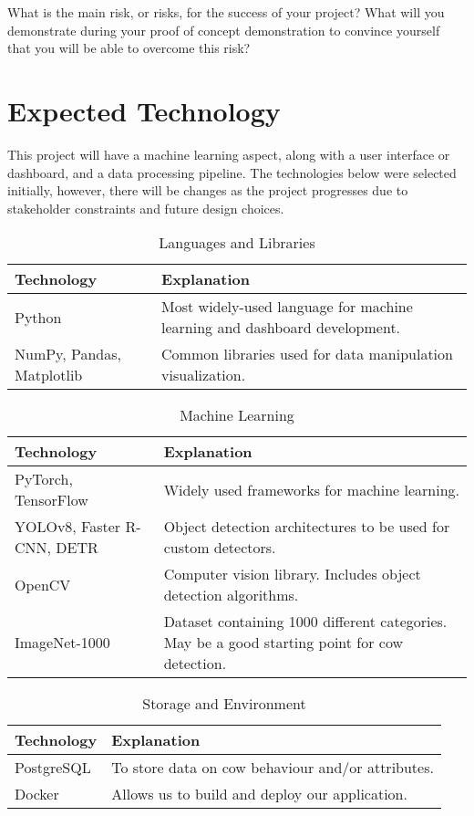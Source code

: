 \documentclass{article}
\begin{document}
What is the main risk, or risks, for the success of your project?  What will you
demonstrate during your proof of concept demonstration to convince yourself that
you will be able to overcome this risk?

\section{Expected Technology}

This project will have a machine learning aspect, along with a user interface or dashboard, and a data processing pipeline. The technologies below were selected initially, however, there will be changes as the project progresses due to stakeholder constraints and future design choices.

\begin{table}[H]
\caption{Languages and Libraries} \label{TblLanguagesAndLibraries}
\begin{tabularx}{\textwidth}{p{3.5cm}p{7cm}}
\toprule
\textbf{Technology} & \textbf{Explanation}\\
\midrule
Python & Most widely-used language for machine learning and dashboard development.\\
\addlinespace
NumPy, Pandas, Matplotlib & Common libraries used for data manipulation visualization.\\
\bottomrule
\end{tabularx}
\end{table}

\begin{table}[!htbp]
\caption{Machine Learning} \label{TblMachineLearning}
\begin{tabularx}{\textwidth}{p{3.5cm}p{7cm}}
\toprule
\textbf{Technology} & \textbf{Explanation}\\
\midrule
PyTorch, TensorFlow & Widely used frameworks for machine learning.\\
\addlinespace
YOLOv8, Faster R-CNN, DETR & Object detection architectures to be used for custom detectors.\\
\addlinespace
OpenCV & Computer vision library. Includes object detection algorithms.\\
\addlinespace
ImageNet-1000 & Dataset containing 1000 different categories. May be a good starting point for cow detection.\\
\bottomrule
\end{tabularx}
\end{table}

\begin{table}[!htbp]
\caption{Storage and Environment} \label{TblStorageAndEnvironment}
\begin{tabularx}{\textwidth}{p{3cm}p{7.5cm}}
\toprule
\textbf{Technology} & \textbf{Explanation}\\
\midrule
PostgreSQL & To store data on cow behaviour and/or attributes.\\
\addlinespace
Docker & Allows us to build and deploy our application.\\
\bottomrule
\end{tabularx}
\end{table}
\end{document}
